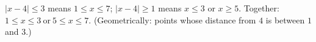 $|x-4|\le3$ means $1\le x\le7$; $|x-4|\ge1$ means $x\le3$ or $x\ge5$. Together: $\boxed{1\le x\le3\ \text{or}\ 5\le x\le7}$. (Geometrically: points whose distance from $4$ is between $1$ and $3$.)
